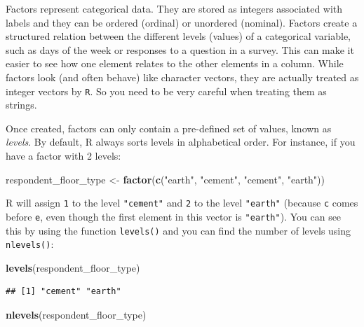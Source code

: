 \documentclass[
]{article}
\newenvironment{Shaded}{\begin{snugshade}}{\end{snugshade}}
\newcommand{\FunctionTok}[1]{\textcolor[rgb]{0.13,0.29,0.53}{\textbf{#1}}}
\newcommand{\NormalTok}[1]{#1}
\newcommand{\OtherTok}[1]{\textcolor[rgb]{0.56,0.35,0.01}{#1}}
\newcommand{\StringTok}[1]{\textcolor[rgb]{0.31,0.60,0.02}{#1}}
\begin{document}
Factors represent categorical data. They are stored as integers
associated with labels and they can be ordered (ordinal) or unordered
(nominal). Factors create a structured relation between the different
levels (values) of a categorical variable, such as days of the week or
responses to a question in a survey. This can make it easier to see how
one element relates to the other elements in a column. While factors
look (and often behave) like character vectors, they are actually
treated as integer vectors by \texttt{R}. So you need to be very careful
when treating them as strings.

Once created, factors can only contain a pre-defined set of values,
known as \emph{levels}. By default, R always sorts levels in
alphabetical order. For instance, if you have a factor with 2 levels:

\begin{Shaded}
\begin{Highlighting}[]
\NormalTok{respondent\_floor\_type }\OtherTok{\textless{}{-}} \FunctionTok{factor}\NormalTok{(}\FunctionTok{c}\NormalTok{(}\StringTok{"earth"}\NormalTok{, }\StringTok{"cement"}\NormalTok{, }\StringTok{"cement"}\NormalTok{, }\StringTok{"earth"}\NormalTok{))}
\end{Highlighting}
\end{Shaded}

R will assign \texttt{1} to the level \texttt{"cement"} and \texttt{2}
to the level \texttt{"earth"} (because \texttt{c} comes before
\texttt{e}, even though the first element in this vector is
\texttt{"earth"}). You can see this by using the function
\texttt{levels()} and you can find the number of levels using
\texttt{nlevels()}:

\begin{Shaded}
\begin{Highlighting}[]
\FunctionTok{levels}\NormalTok{(respondent\_floor\_type)}
\end{Highlighting}
\end{Shaded}

\begin{verbatim}
## [1] "cement" "earth"
\end{verbatim}

\begin{Shaded}
\begin{Highlighting}[]
\FunctionTok{nlevels}\NormalTok{(respondent\_floor\_type)}
\end{Highlighting}
\end{Shaded}
\end{document}

